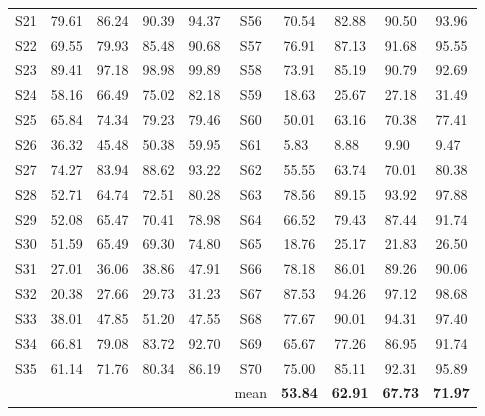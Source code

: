 \documentclass[10pt]{iopart}
\begin{document}
\begin{table*}[htbp]
\begin{center}
\begin{tabular}{ccccc|ccccc}
S21                                & 79.61              & 86.24 & 90.39 & 94.37 & S56                                & 70.54 & 82.88 & 90.50 & 93.96 \\
S22                                & 69.55              & 79.93 & 85.48 & 90.68 & S57                                & 76.91 & 87.13 & 91.68 & 95.55 \\
S23                                & 89.41              & 97.18 & 98.98 & 99.89 & S58                                & 73.91 & 85.19 & 90.79 & 92.69 \\
S24                                & 58.16              & 66.49 & 75.02 & 82.18 & S59                                & 18.63 & 25.67 & 27.18 & 31.49 \\
S25                                & 65.84              & 74.34 & 79.23 & 79.46 & S60                                & 50.01 & 63.16 & 70.38 & 77.41 \\
S26                                & 36.32              & 45.48 & 50.38 & 59.95 & S61                                & 5.83\ & 8.88\ & 9.90\ & 9.47\ \\
S27                                & 74.27              & 83.94 & 88.62 & 93.22 & S62                                & 55.55 & 63.74 & 70.01 & 80.38 \\
S28                                & 52.71              & 64.74 & 72.51 & 80.28 & S63                                & 78.56 & 89.15 & 93.92 & 97.88 \\
S29                                & 52.08              & 65.47 & 70.41 & 78.98 & S64                                & 66.52 & 79.43 & 87.44 & 91.74 \\
S30                                & 51.59              & 65.49 & 69.30 & 74.80 & S65                                & 18.76 & 25.17 & 21.83 & 26.50 \\
S31                                & 27.01              & 36.06 & 38.86 & 47.91 & S66                                & 78.18 & 86.01 & 89.26 & 90.06 \\
S32                                & 20.38              & 27.66 & 29.73 & 31.23 & S67                                & 87.53 & 94.26 & 97.12 & 98.68 \\
S33                                & 38.01              & 47.85 & 51.20 & 47.55 & S68                                & 77.67 & 90.01 & 94.31 & 97.40 \\
S34                                & 66.81              & 79.08 & 83.72 & 92.70 & S69                                & 65.67 & 77.26 & 86.95 & 91.74 \\
S35                                & 61.14              & 71.76 & 80.34 & 86.19 & S70                                & 75.00 & 85.11 & 92.31 & 95.89 \\
                               & \multicolumn{1}{l}{} &         &         &         &                   mean                         & \textbf{53.84} & \textbf{62.91} & \textbf{67.73} & \textbf{71.97} \\ \hline
\end{tabular}
\end{center}
\end{table*}
\end{document}
